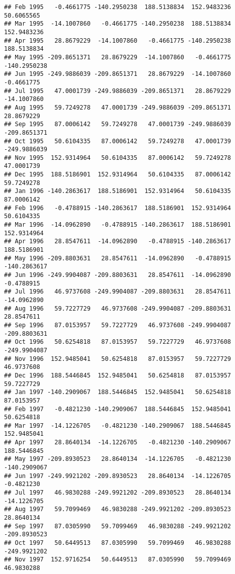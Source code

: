 \documentclass[]{article}
\begin{document}
\begin{verbatim}
## Feb 1995   -0.4661775 -140.2950238  188.5138834  152.9483236   50.6065565
## Mar 1995  -14.1007860   -0.4661775 -140.2950238  188.5138834  152.9483236
## Apr 1995   28.8679229  -14.1007860   -0.4661775 -140.2950238  188.5138834
## May 1995 -209.8651371   28.8679229  -14.1007860   -0.4661775 -140.2950238
## Jun 1995 -249.9886039 -209.8651371   28.8679229  -14.1007860   -0.4661775
## Jul 1995   47.0001739 -249.9886039 -209.8651371   28.8679229  -14.1007860
## Aug 1995   59.7249278   47.0001739 -249.9886039 -209.8651371   28.8679229
## Sep 1995   87.0006142   59.7249278   47.0001739 -249.9886039 -209.8651371
## Oct 1995   50.6104335   87.0006142   59.7249278   47.0001739 -249.9886039
## Nov 1995  152.9314964   50.6104335   87.0006142   59.7249278   47.0001739
## Dec 1995  188.5186901  152.9314964   50.6104335   87.0006142   59.7249278
## Jan 1996 -140.2863617  188.5186901  152.9314964   50.6104335   87.0006142
## Feb 1996   -0.4788915 -140.2863617  188.5186901  152.9314964   50.6104335
## Mar 1996  -14.0962890   -0.4788915 -140.2863617  188.5186901  152.9314964
## Apr 1996   28.8547611  -14.0962890   -0.4788915 -140.2863617  188.5186901
## May 1996 -209.8803631   28.8547611  -14.0962890   -0.4788915 -140.2863617
## Jun 1996 -249.9904087 -209.8803631   28.8547611  -14.0962890   -0.4788915
## Jul 1996   46.9737608 -249.9904087 -209.8803631   28.8547611  -14.0962890
## Aug 1996   59.7227729   46.9737608 -249.9904087 -209.8803631   28.8547611
## Sep 1996   87.0153957   59.7227729   46.9737608 -249.9904087 -209.8803631
## Oct 1996   50.6254818   87.0153957   59.7227729   46.9737608 -249.9904087
## Nov 1996  152.9485041   50.6254818   87.0153957   59.7227729   46.9737608
## Dec 1996  188.5446845  152.9485041   50.6254818   87.0153957   59.7227729
## Jan 1997 -140.2909067  188.5446845  152.9485041   50.6254818   87.0153957
## Feb 1997   -0.4821230 -140.2909067  188.5446845  152.9485041   50.6254818
## Mar 1997  -14.1226705   -0.4821230 -140.2909067  188.5446845  152.9485041
## Apr 1997   28.8640134  -14.1226705   -0.4821230 -140.2909067  188.5446845
## May 1997 -209.8930523   28.8640134  -14.1226705   -0.4821230 -140.2909067
## Jun 1997 -249.9921202 -209.8930523   28.8640134  -14.1226705   -0.4821230
## Jul 1997   46.9830288 -249.9921202 -209.8930523   28.8640134  -14.1226705
## Aug 1997   59.7099469   46.9830288 -249.9921202 -209.8930523   28.8640134
## Sep 1997   87.0305990   59.7099469   46.9830288 -249.9921202 -209.8930523
## Oct 1997   50.6449513   87.0305990   59.7099469   46.9830288 -249.9921202
## Nov 1997  152.9716254   50.6449513   87.0305990   59.7099469   46.9830288

\end{verbatim}
\end{document}
